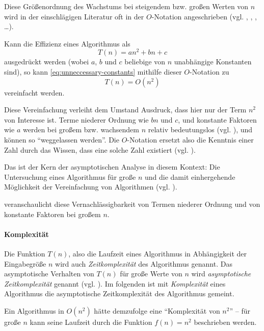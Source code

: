Diese Größenordnung des Wachstums bei steigendem bzw. großen Werten von $n$ wird in der einschlägigen Literatur oft in der $O$-Notation angeschrieben (vgl. \cite[2]{ahu1974}, \cite[107]{taocp1}, \cite[29]{hsr1997}, \ldots).

Kann die Effizienz eines Algorithmus als
\begin{equation}\label{eq:unneccessary-constants}
    T(n) = an^2 + bn + c
\end{equation}
ausgedrückt werden (wobei $a$, $b$ und $c$ beliebige von $n$ unabhängige Konstanten sind), so kann \eqref{eq:unneccessary-constants} mithilfe dieser $O$-Notation zu
\begin{equation}\label{eq:basic-o-notation}
    T(n) = O(n^2)
\end{equation}
vereinfacht werden.

Diese Vereinfachung verleiht dem Umstand Ausdruck, dass hier nur der Term $n^2$ von Interesse ist. Terme niederer Ordnung wie $bn$ und $c$, und konstante Faktoren wie $a$ werden bei großem bzw. wachsendem $n$ relativ bedeutungslos (vgl. \cite[28]{clrs2001}), und können so \enquote{weggelassen werden}. Die $O$-Notation ersetzt also die Kenntnis einer Zahl durch das Wissen, dass eine solche Zahl existiert (vgl. \cite[3]{bru1958}).

Das ist der Kern der asymptotischen Analyse in diesem Kontext: Die Untersuchung eines Algorithmus für große $n$ und die damit einhergehende Möglichkeit der Vereinfachung von Algorithmen (vgl. \cite[63]{sha2011}).



 veranschaulicht diese Vernachlässigbarkeit von Termen niederer Ordnung und von konstante Faktoren bei großem $n$.

\paragraph{Komplexität} Die Funktion $T(n)$, also die Laufzeit eines Algorithmus in Abhängigkeit der Eingabegröße $n$ wird auch \emph{Zeitkomplexität} des Algorithmus genannt. Das asymptotische Verhalten von $T(n)$ für große Werte von $n$ wird \emph{asymptotische Zeitkomplexität} genannt (vgl. \cite[2]{ahu1974}). Im folgenden ist mit \emph{Komplexität} eines Algorithmus die asymptotische Zeitkomplexität des Algorithmus gemeint.

Ein Algorithmus in $O(n^2)$ hätte demzufolge eine \enquote{Komplexität von $n^2$} -- für große $n$ kann seine Laufzeit durch die Funktion $f(n) = n^2$ beschrieben werden.

